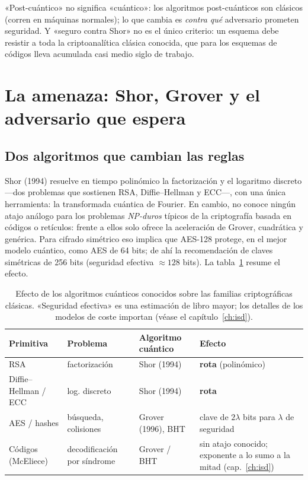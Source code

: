 \documentclass[11pt,a4paper,oneside]{report}
\begin{document}
\begin{roadmap}
«Post-cuántico» no significa «cuántico»: los algoritmos post-cuánticos son
clásicos (corren en máquinas normales); lo que cambia es \emph{contra qué}
adversario prometen seguridad. Y «seguro contra Shor» no es el único
criterio: un esquema debe resistir a toda la criptoanalítica clásica
conocida, que para los esquemas de códigos lleva acumulada casi medio siglo
de trabajo.
\end{roadmap}

\section{La amenaza: Shor, Grover y el adversario que espera}

\subsection*{Dos algoritmos que cambian las reglas}

Shor (1994) resuelve en tiempo polinómico la factorización y el logaritmo
discreto ---dos problemas que sostienen RSA, Diffie--Hellman y ECC---, con
una única herramienta: la transformada cuántica de Fourier. En cambio, no
conoce ningún atajo análogo para los problemas \emph{NP-duros} típicos de la
criptografía basada en códigos o retículos: frente a ellos solo ofrece la
aceleración de Grover, cuadrática y genérica. Para cifrado simétrico eso
implica que AES-128 protege, en el mejor modelo cuántico, como AES de 64
bits; de ahí la recomendación de claves simétricas de 256 bits
(seguridad efectiva $\approx 128$ bits). La tabla~\ref{tab:cuanticos}
resume el efecto.

\begin{table}[htbp]
\centering
\caption{Efecto de los algoritmos cuánticos conocidos sobre las familias
criptográficas clásicas. «Seguridad efectiva» es una estimación de libro
mayor; los detalles de los modelos de coste importan (véase el
capítulo~\ref{ch:isd}).}
\label{tab:cuanticos}
\small
\begin{tabularx}{\textwidth}{@{}l l l X@{}}
\toprule
\textbf{Primitiva} & \textbf{Problema} & \textbf{Algoritmo cuántico} & \textbf{Efecto} \\
\midrule
RSA & factorización & Shor (1994) & \textbf{rota} (polinómico) \\
Diffie--Hellman / ECC & log. discreto & Shor (1994) & \textbf{rota} \\
AES / hashes & búsqueda, colisiones & Grover (1996), BHT & clave de $2\lambda$ bits para $\lambda$ de seguridad \\
Códigos (McEliece) & decodificación por síndrome & Grover / BHT & sin atajo conocido; exponente a lo sumo a la mitad (cap.~\ref{ch:isd}) \\
\bottomrule
\end{tabularx}
\end{table}
\end{document}
